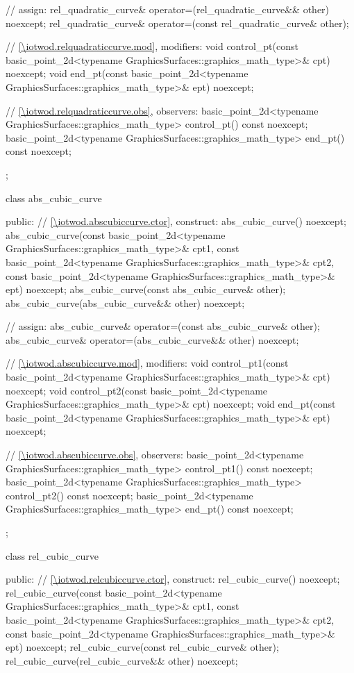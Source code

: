 \begin{codeblock}
{{{      // assign:
      rel_quadratic_curve& operator=(rel_quadratic_curve&& other) noexcept;
      rel_quadratic_curve& operator=(const rel_quadratic_curve& other);

      // \ref{\iotwod.relquadraticcurve.mod}, modifiers:
      void control_pt(const basic_point_2d<typename
        GraphicsSurfaces::graphics_math_type>& cpt) noexcept;
      void end_pt(const basic_point_2d<typename
        GraphicsSurfaces::graphics_math_type>& ept) noexcept;

      // \ref{\iotwod.relquadraticcurve.obs}, observers:
      basic_point_2d<typename GraphicsSurfaces::graphics_math_type> control_pt() const noexcept;
      basic_point_2d<typename GraphicsSurfaces::graphics_math_type> end_pt() const noexcept;
    };

    class abs_cubic_curve {
    public:
      // \ref{\iotwod.abscubiccurve.ctor}, construct:
      abs_cubic_curve() noexcept;
      abs_cubic_curve(const basic_point_2d<typename GraphicsSurfaces::graphics_math_type>& cpt1,
        const basic_point_2d<typename GraphicsSurfaces::graphics_math_type>& cpt2,
        const basic_point_2d<typename GraphicsSurfaces::graphics_math_type>& ept) noexcept;
      abs_cubic_curve(const abs_cubic_curve& other);
      abs_cubic_curve(abs_cubic_curve&& other) noexcept;

      // assign:
      abs_cubic_curve& operator=(const abs_cubic_curve& other);
      abs_cubic_curve& operator=(abs_cubic_curve&& other) noexcept;

      // \ref{\iotwod.abscubiccurve.mod}, modifiers:
      void control_pt1(const basic_point_2d<typename
        GraphicsSurfaces::graphics_math_type>& cpt) noexcept;
      void control_pt2(const basic_point_2d<typename
        GraphicsSurfaces::graphics_math_type>& cpt) noexcept;
      void end_pt(const basic_point_2d<typename
        GraphicsSurfaces::graphics_math_type>& ept) noexcept;

      // \ref{\iotwod.abscubiccurve.obs}, observers:
      basic_point_2d<typename GraphicsSurfaces::graphics_math_type> control_pt1() const noexcept;
      basic_point_2d<typename GraphicsSurfaces::graphics_math_type> control_pt2() const noexcept;
      basic_point_2d<typename GraphicsSurfaces::graphics_math_type> end_pt() const noexcept;
    };

    class rel_cubic_curve {
    public:
      // \ref{\iotwod.relcubiccurve.ctor}, construct:
      rel_cubic_curve() noexcept;
      rel_cubic_curve(const basic_point_2d<typename GraphicsSurfaces::graphics_math_type>& cpt1,
      const basic_point_2d<typename GraphicsSurfaces::graphics_math_type>& cpt2,
      const basic_point_2d<typename GraphicsSurfaces::graphics_math_type>& ept) noexcept;
      rel_cubic_curve(const rel_cubic_curve& other);
      rel_cubic_curve(rel_cubic_curve&& other) noexcept;

}}}
\end{codeblock}
